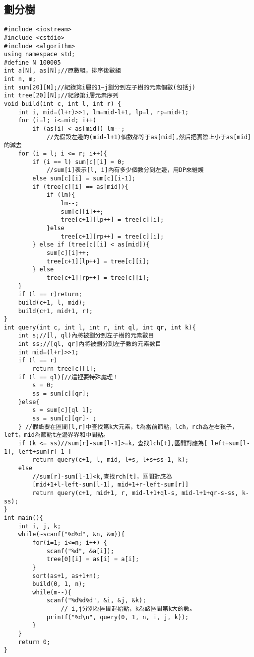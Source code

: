 \documentclass[11pt,twocolumn,a4paper]{article}
\begin{document}
\subsection{劃分樹}
\begin{lstlisting}[label=劃分樹]
#include <iostream>
#include <cstdio>
#include <algorithm>
using namespace std;
#define N 100005
int a[N], as[N];//原數組，排序後數組 
int n, m;
int sum[20][N];//紀錄第i層的1~j劃分到左子樹的元素個數(包括j)
int tree[20][N];//紀錄第i層元素序列
void build(int c, int l, int r) {
	int i, mid=(l+r)>>1, lm=mid-l+1, lp=l, rp=mid+1;
	for (i=l; i<=mid; i++)
		if (as[i] < as[mid]) lm--;
			//先假設左邊的(mid-l+1)個數都等于as[mid],然后把實際上小于as[mid]的減去
	for (i = l; i <= r; i++){
		if (i == l) sum[c][i] = 0;
			//sum[i]表示[l, i]內有多少個數分到左邊，用DP來維護 
		else sum[c][i] = sum[c][i-1];
		if (tree[c][i] == as[mid]){
			if (lm){
				lm--;
				sum[c][i]++;
				tree[c+1][lp++] = tree[c][i];
			}else
				tree[c+1][rp++] = tree[c][i];
		} else if (tree[c][i] < as[mid]){
			sum[c][i]++;
			tree[c+1][lp++] = tree[c][i];
		} else
			tree[c+1][rp++] = tree[c][i];
	}
	if (l == r)return;
	build(c+1, l, mid);
	build(c+1, mid+1, r);
}
int query(int c, int l, int r, int ql, int qr, int k){
	int s;//[l, ql)內將被劃分到左子樹的元素數目
	int ss;//[ql, qr]內將被劃分到左子數的元素數目
	int mid=(l+r)>>1;
	if (l == r)
		return tree[c][l];
	if (l == ql){//這裡要特殊處理！
		s = 0;
		ss = sum[c][qr];
	}else{
		s = sum[c][ql 1];
		ss = sum[c][qr]- ;
	} //假設要在區間[l,r]中查找第k大元素，t為當前節點，lch，rch為左右孩子，left，mid為節點t左邊界界和中間點。
	if (k <= ss)//sum[r]-sum[l-1]>=k，查找lch[t],區間對應為[ left+sum[l-1], left+sum[r]-1 ]
		return query(c+1, l, mid, l+s, l+s+ss-1, k);
	else
		//sum[r]-sum[l-1]<k,查找rch[t]，區間對應為
		[mid+1+l-left-sum[l-1], mid+1+r-left-sum[r]]
		return query(c+1, mid+1, r, mid-l+1+ql-s, mid-l+1+qr-s-ss, k-ss);
}
int main(){
	int i, j, k;
	while(~scanf("%d%d", &n, &m)){
		for(i=1; i<=n; i++) {
			scanf("%d", &a[i]);
			tree[0][i] = as[i] = a[i];
		}
		sort(as+1, as+1+n);
		build(0, 1, n);
		while(m--){
			scanf("%d%d%d", &i, &j, &k);
				// i,j分別為區間起始點，k為該區間第k大的數。
			printf("%d\n", query(0, 1, n, i, j, k));
		}
	}
	return 0;
}
\end{lstlisting}

\newpage
\end{document}
